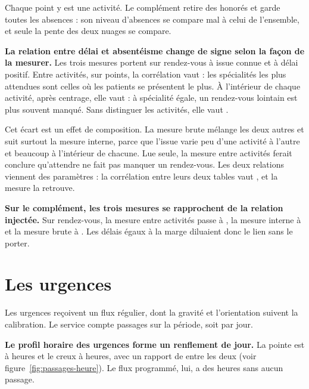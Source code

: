 Chaque point y est une activité. Le complément retire des honorés et garde toutes les absences : son
niveau d'absences se compare mal à celui de l'ensemble, et seule la pente des deux nuages se compare.

\textbf{La relation entre délai et absentéisme change de signe selon la façon de la
mesurer.} Les trois mesures portent sur  rendez-vous à issue
connue et à délai positif. Entre activités, sur  points, la corrélation vaut
 : les spécialités les plus attendues sont celles où les
patients se présentent le plus. À l'intérieur de chaque activité, après centrage, elle vaut
 : à spécialité égale, un rendez-vous lointain est plus
souvent manqué. Sans distinguer les activités, elle vaut .

Cet écart est un effet de composition. La mesure brute mélange les deux autres et suit surtout la
mesure interne, parce que l'issue varie peu d'une activité à l'autre et beaucoup à l'intérieur de
chacune. Lue seule, la mesure entre activités ferait conclure qu'attendre ne fait pas manquer un
rendez-vous. Les deux relations viennent des paramètres : la corrélation entre leurs deux tables vaut
, et la mesure la retrouve.

\textbf{Sur le complément, les trois mesures se rapprochent de la relation
injectée.} Sur  rendez-vous, la mesure entre activités passe à
, la mesure interne à
 et la mesure brute à
. Les délais égaux à la marge diluaient donc le lien sans
le porter.

\section{Les urgences}

Les urgences reçoivent un flux régulier, dont la gravité et l'orientation suivent la calibration. Le
service compte  passages sur la période, soit
 par jour.

\textbf{Le profil horaire des urgences forme un renflement de jour.} La pointe est à
 heures et le creux à  heures, avec un
rapport de  entre les deux (voir
figure~\ref{fig:passages-heure}). Le flux programmé, lui, a des heures sans aucun passage.

